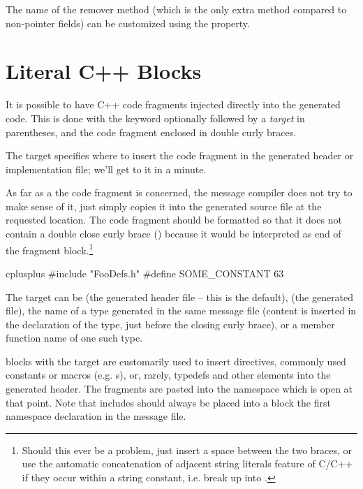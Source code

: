 The name of the remover method (which is the only extra method compared to
non-pointer fields) can be customized using the  property.


\section{Literal C++ Blocks}
\label{sec:msg-defs:cplusplus-blocks}

It is possible to have C++ code fragments injected directly into the generated
code. This is done with the  keyword optionally followed by
a \textit{target} in parentheses, and the code fragment enclosed in double curly
braces.

The target specifies where to insert the code fragment in the generated header
or implementation file; we'll get to it in a minute.

As far as a the code fragment is concerned, the message compiler does not try to
make sense of it, just simply copies it into the generated source file at the
requested location. The code fragment should be formatted so that it does not
contain a double close curly brace (\ttt{\}\}}) because it would be interpreted as
end of the fragment block.\footnote{Should this ever be a problem, just insert a space
between the two braces, or use the automatic concatenation of adjacent string literals
feature of C/C++ if they occur within a string constant, i.e. break up 
into .}

\begin{msg}
cplusplus {{
#include "FooDefs.h"
#define SOME_CONSTANT 63
}}
\end{msg}

The target can be  (the generated header file -- this is the default),
 (the generated  file), the name of a type generated in the
same message file (content is inserted in the declaration of the type, just
before the closing curly brace), or a member function name of one such type.

 blocks with the target  are customarily used to
insert  directives, commonly used constants or macros (e.g.
s), or, rarely, typedefs and other elements into the generated
header. The fragments are pasted into the namespace which is open at that point.
Note that includes should always be placed into a  block
 the first namespace declaration in the message file.

